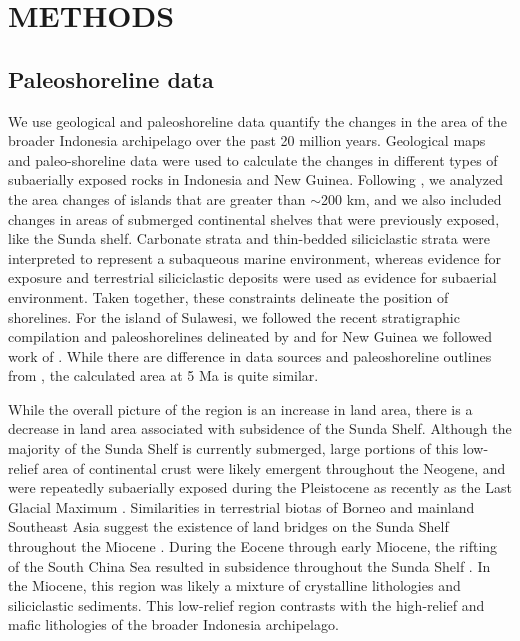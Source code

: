 \documentclass[11pt,letterpaper]{article}
\newcommand{\pCOtwo}{\textit{p}CO$_{2}$\xspace}
\begin{document}

\section*{METHODS}

\subsection*{Paleoshoreline data}

We use geological and paleoshoreline data quantify the changes in the area of the broader Indonesia archipelago over the past 20 million years. Geological maps and paleo-shoreline data were used to calculate the changes in different types of subaerially exposed rocks in Indonesia and New Guinea. Following \citet{Molnar2015a}, we analyzed the area changes of islands that are greater than $\sim$200 km, and we also included changes in areas of submerged continental shelves that were previously exposed, like the Sunda shelf. Carbonate strata and thin-bedded siliciclastic strata were interpreted to represent a subaqueous marine environment, whereas evidence for exposure and terrestrial siliciclastic deposits were used as evidence for subaerial environment. Taken together, these constraints delineate the position of shorelines. For the island of Sulawesi, we followed the recent stratigraphic compilation and paleoshorelines delineated by \citet{Nugraha2018a} and for New Guinea we followed work of \citet{Gold2017a, Cloos2005a, Norvick2003a}. While there are difference in data sources and paleoshoreline outlines from \cite{Molnar2015a}, the calculated area at 5 Ma is quite similar. 

While the overall picture of the region is an increase in land area, there is a decrease in land area associated with subsidence of the Sunda Shelf. Although the majority of the Sunda Shelf is currently submerged, large portions of this low-relief area of continental crust were likely emergent throughout the Neogene, and were repeatedly subaerially exposed during the Pleistocene as recently as the Last Glacial Maximum \citep{Halls2002a}. Similarities in terrestrial biotas of Borneo and mainland Southeast Asia suggest the existence of land bridges on the Sunda Shelf throughout the Miocene \citep{Moss1998a}. During the Eocene through early Miocene, the rifting of the South China Sea resulted in subsidence throughout the Sunda Shelf \citep{Morley2013a}. In the Miocene, this region was likely a mixture of crystalline lithologies and siliciclastic sediments. This low-relief region contrasts with the high-relief and mafic lithologies of the broader Indonesia archipelago.
\end{document}
